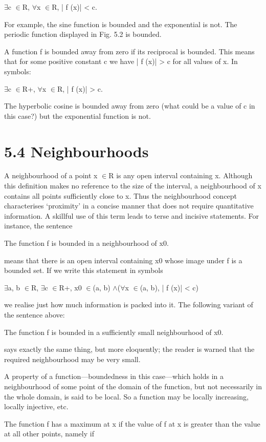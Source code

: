 \documentclass[11pt]{article}
\theoremstyle{plain}
\theoremstyle{definition}
\begin{document}
$\exists$c $\in$R, $\forall$x $\in$R, | f (x)| < c.

For example, the sine function is bounded and the exponential is not. The periodic function displayed in Fig. 5.2 is bounded.

A function f is bounded away from zero if its reciprocal is bounded. This means that for some positive constant c we have | f (x)| > c for all values of x. In symbols:

$\exists$c $\in$R+, $\forall$x $\in$R, | f (x)| > c.

The hyperbolic cosine is bounded away from zero (what could be a value of c in this case?) but the exponential function is not.

\section{5.4 Neighbourhoods}

A neighbourhood of a point x $\in$R is any open interval containing x. Although this definition makes no reference to the size of the interval, a neighbourhood of x contains all points sufficiently close to x. Thus the neighbourhood concept characterises `proximity' in a concise manner that does not require quantitative information. A skillful use of this term leads to terse and incisive statements. For instance, the sentence

The function f is bounded in a neighbourhood of x0.

means that there is an open interval containing x0 whose image under f is a bounded set. If we write this statement in symbols

$\exists$a, b $\in$R, $\exists$c $\in$R+, x0 $\in$(a, b) $\land$($\forall$x $\in$(a, b), | f (x)| < c)

we realise just how much information is packed into it. The following variant of the sentence above:

The function f is bounded in a sufficiently small neighbourhood of x0.

says exactly the same thing, but more eloquently; the reader is warned that the required neighbourhood may be very small.

A property of a function---boundedness in this case---which holds in a neighbourhood of some point of the domain of the function, but not necessarily in the whole domain, is said to be local. So a function may be locally increasing, locally injective, etc.

The function f has a maximum at x if the value of f at x is greater than the value at all other points, namely if
\end{document}
